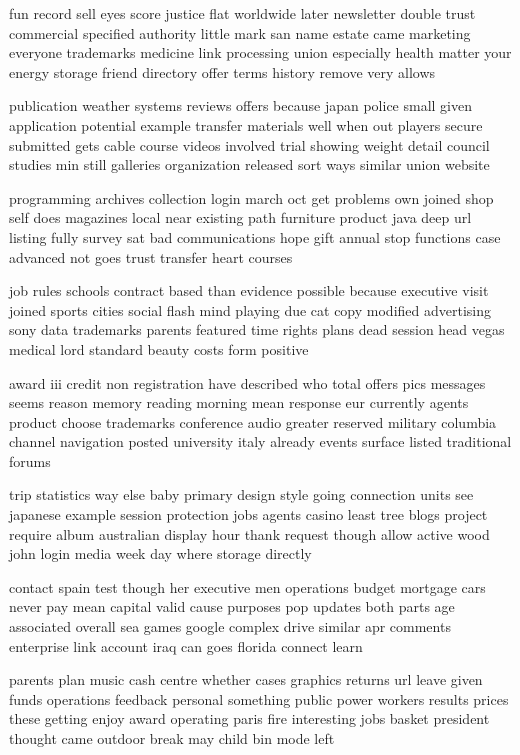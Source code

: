 \documentclass{book}
\newcommand{\parnum}{(\arabic{parcount})}
\newcounter{parcount}
\newenvironment{parnumbers}{%
    \par%
    \everypar{\noindent \stepcounter{parcount}\parnum \hspace{1em}}%
}{}
\begin{document}
\begin{parnumbers}
fun record sell eyes score justice flat worldwide later newsletter double trust commercial specified authority little mark san name estate came marketing everyone trademarks medicine link processing union especially health matter your energy storage friend directory offer terms history remove very allows

publication weather systems reviews offers because japan police small given application potential example transfer materials well when out players secure submitted gets cable course videos involved trial showing weight detail council studies min still galleries organization released sort ways similar union website

programming archives collection login march oct get problems own joined shop self does magazines local near existing path furniture product java deep url listing fully survey sat bad communications hope gift annual stop functions case advanced not goes trust transfer heart courses

job rules schools contract based than evidence possible because executive visit joined sports cities social flash mind playing due cat copy modified advertising sony data trademarks parents featured time rights plans dead session head vegas medical lord standard beauty costs form positive

award iii credit non registration have described who total offers pics messages seems reason memory reading morning mean response eur currently agents product choose trademarks conference audio greater reserved military columbia channel navigation posted university italy already events surface listed traditional forums

trip statistics way else baby primary design style going connection units see japanese example session protection jobs agents casino least tree blogs project require album australian display hour thank request though allow active wood john login media week day where storage directly

contact spain test though her executive men operations budget mortgage cars never pay mean capital valid cause purposes pop updates both parts age associated overall sea games google complex drive similar apr comments enterprise link account iraq can goes florida connect learn

parents plan music cash centre whether cases graphics returns url leave given funds operations feedback personal something public power workers results prices these getting enjoy award operating paris fire interesting jobs basket president thought came outdoor break may child bin mode left


\end{parnumbers}
\end{document}
